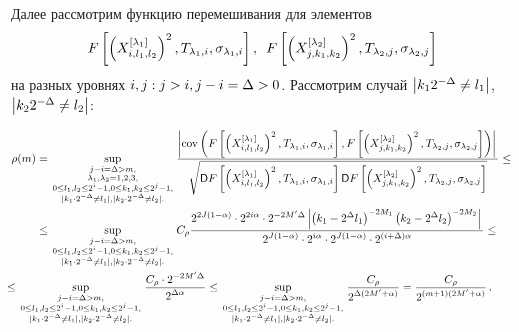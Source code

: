 \pagebreak

Далее рассмотрим функцию перемешивания для элементов
$$
F\left[\left(X_{i,l_1,l_2}^{[\lambda_1]}\right)^2,T_{\lambda_1,i},
\sigma_{\lambda_1,i}\right],\enskip
F\left[\left(X_{j,k_1,k_2}^{[\lambda_2]}\right)^2,T_{\lambda_2,j},\sigma_{\lambda_2,j}\right]
$$
на разных уровнях $i,j: j\hm>i, j\hm-i\hm=\Delta\hm>0$.
Рассмотрим случай $\left\vert k_{1}2^{-\Delta} \hm\neq l_{1}\right\vert$,
$\left\vert k_{2}2^{-\Delta} \hm\neq l_{2}\right\vert$:

\noindent
\begin{align}
\rho(m)
&=\sup\limits_{{\begin{smallmatrix}j-i=\Delta>m,\\
\lambda_1, \lambda_2= 1,2,3,\\ 0\leq l_1,l_2\leq2^i-1,
0\leq k_1,k_2\leq2^j-1,\\|k_{1}\cdot2^{-\Delta}\neq
l_{1}|,|k_{2}\cdot2^{-\Delta}\neq l_{2}|.\end{smallmatrix}}}
\fr{\abs{\cov\left(F\left[\left(X_{i,l_1,l_2}^{[\lambda_1]}\right)^2,T_{\lambda_1,i},
\sigma_{\lambda_1,i}\right],
F\left[\left(X_{j,k_1,k_2}^{[\lambda_2]}\right)^2,T_{\lambda_2,j},
\sigma_{\lambda_2,j}\right]\right)}}
{\sqrt{\Variance F\left[\left(X_{i,l_1,l_2}^{[\lambda_1]}\right)^2,T_{\lambda_1,i},
\sigma_{\lambda_1,i}\right] \Variance F
\left[\left(X_{j,k_1,k_2}^{[\lambda_2]}\right)^2,
T_{\lambda_2,j},\sigma_{\lambda_2,j}\right]}}\leq{}\notag\\
&{}\leq \sup\limits_{{\begin{smallmatrix}j-i=\Delta>m,\\
0\leq l_1,l_2\leq2^i-1, 0\leq k_1,k_2\leq2^j-1,\\
|k_{1}\cdot2^{-\Delta}\neq l_{1}|,|k_{2}\cdot2^{-\Delta}\neq l_{2}|.
\end{smallmatrix}}} C_\rho\fr{2^{2J(1-\alpha)}\cdot2^{2i\alpha}\cdot2^{-2 M' \Delta}
\left\vert \left(k_1 - 2^{\Delta}l_1\right)^{-2M_1} \left(k_2-
2^{\Delta}l_2\right)^{-2M_2}\right\vert}
{2^{J(1-\alpha)}\cdot 2^{i\alpha}\cdot 2^{J(1-\alpha)}\cdot2^{(i+\Delta)\alpha}}\leq{}\notag\\
&\hspace*{-10mm}{}\leq \sup\limits_{{\begin{smallmatrix}j-i=\Delta>m,\\
0\leq l_1,l_2\leq2^i-1, 0\leq k_1,k_2\leq2^j-1,\\
|k_{1}\cdot2^{-\Delta}\neq l_{1}|,|k_{2}\cdot2^{-\Delta}\neq l_{2}|.
\end{smallmatrix}}} \fr{C_\rho\cdot 2^{-2M'\Delta}}{2^{\Delta\alpha}}
\leq \sup\limits_{{\begin{smallmatrix}
j-i=\Delta>m,\\ 0\leq l_1,l_2\leq2^i-1, 0\leq k_1,k_2\leq2^j-1,\\
|k_{1}\cdot2^{-\Delta}\neq l_{1}|,|k_{2}\cdot2^{-\Delta}\neq l_{2}|.
\end{smallmatrix}}}\fr{C_\rho}{2^{\Delta(2M' +\alpha)}}
=\fr{C_\rho}{2^{(m+1)(2M' +\alpha)}}\,.
\label{rho_2}
\end{align}

